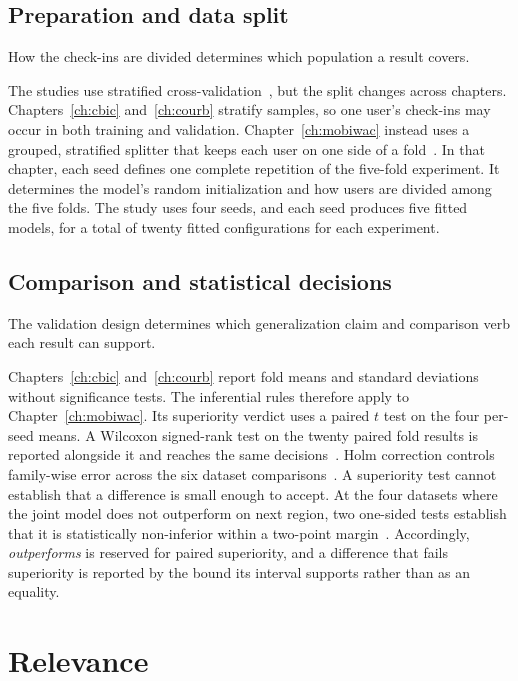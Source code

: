 \subsection{Preparation and data split}

How the check-ins are divided determines which population a result covers.

The studies use stratified cross-validation~\cite{kohavi1995crossval}, but the
split changes across chapters. Chapters~\ref{ch:cbic} and~\ref{ch:courb} stratify
samples, so one user's check-ins may occur in both training and validation.
Chapter~\ref{ch:mobiwac} instead uses a grouped, stratified splitter that keeps each
user on one side of a fold~\cite{pedregosa2011sklearn}. In that chapter, each seed
defines one complete repetition of the five-fold experiment. It determines the model's
random initialization and how users are divided among the five folds. The study uses
four seeds, and each seed produces five fitted models, for a total of twenty fitted configurations for each
experiment.

\subsection{Comparison and statistical decisions}

The validation design determines which generalization claim and comparison verb each
result can support.

Chapters~\ref{ch:cbic} and~\ref{ch:courb} report fold means and standard deviations
without significance tests. The inferential rules therefore apply to
Chapter~\ref{ch:mobiwac}. Its superiority verdict uses a paired $t$ test on the four
per-seed means. A Wilcoxon signed-rank test on the twenty paired fold results is
reported alongside it and reaches the same decisions~\cite{wilcoxon1945}. Holm
correction controls family-wise error across the six dataset
comparisons~\cite{holm1979}. A superiority test cannot establish that a difference is
small enough to accept. At the four datasets where the joint model does not outperform on next region, two one-sided tests
establish that it is statistically non-inferior within a two-point margin~\cite{lakens2017tost}. Accordingly, \emph{outperforms} is reserved for paired
superiority, and a difference that fails superiority is reported by the bound its interval
supports rather than as an equality.


\section{Relevance}
\label{sec:fund:relevance}

